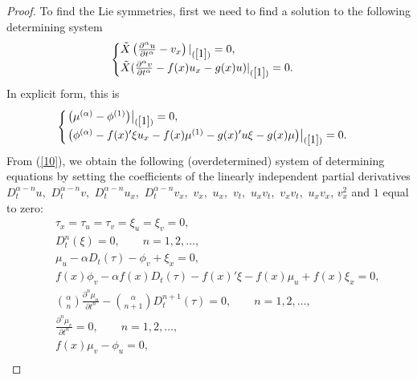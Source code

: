 \documentclass[12pt]{amsart}
\newtheorem*{remark*}{Remark}
\begin{document}

\begin{proof}
To find the Lie symmetries, first we need to find a solution to the following determining system
\begin{equation*}
\begin{cases}
\tilde{X}\left(\frac{\partial^\alpha u}{\partial t^\alpha}-v_x\right)|_{(\ref{1})}=0,\\
\tilde{X}(\frac{\partial^\alpha v}{\partial t^\alpha}-f(x)u_x-g(x)u)|_{(\ref{1})}=0.
\end{cases}
\end{equation*}
In explicit form, this is
\begin{equation}\label{10}
\begin{cases}
\left.\left(\mu^{(\alpha)}-\phi^{(1)}\right)\right|_{(\ref{1})}=0,\\
\left.\left(\phi^{(\alpha)}- f(x)' \xi u_x-f(x)\mu^{(1)}-g(x)'u\xi-g(x)\mu\right)\right|_{(\ref{1})}=0.
\end{cases}
\end{equation}
From (\ref{10}), we obtain the following (overdetermined) system of determining equations by setting the coefficients of the linearly independent partial derivatives $D_t^{\alpha-n}u,$ $D_t^{\alpha-n}v,$ $D_t^{\alpha-n}u_x,$ $D_t^{\alpha-n}v_x,$ $v_x,$ $u_x,$ $v_t,$ $u_x v_t,$ $v_x v_t,$ $u_x v_x$, $v_x^2$ and $1$ equal to zero:
\begin{eqnarray}
& & \tau_x=\tau_u=\tau_v=\xi_u=\xi_v=0,\label{aneg}\\
& & D_t^n(\xi)=0,\qquad n=1,2,\ldots,\label{gurav}\\
& & \mu_u-\alpha D_t(\tau)-\phi_v+\xi_x=0,\label{duruv}\\
& & f(x)\phi_v-\alpha f(x) D_t(\tau)-f(x)'\xi-f(x)\mu_u+f(x)\xi_x=0,\label{es}\\
& & \binom{\alpha}{n}\frac{\partial^n\mu_u}{\partial t^n}-\binom{\alpha}{n+1}D_t^{n+1}(\tau)=0,\qquad n=1,2,\ldots,\label{neg}\\
& & \frac{\partial^n\mu_v}{\partial t^n}=0,\qquad n=1,2,\ldots,\label{hoyor}\\
& & f(x)\mu_v-\phi_u=0,\label{tav}\\

\end{eqnarray}
\end{proof}
\end{document}
